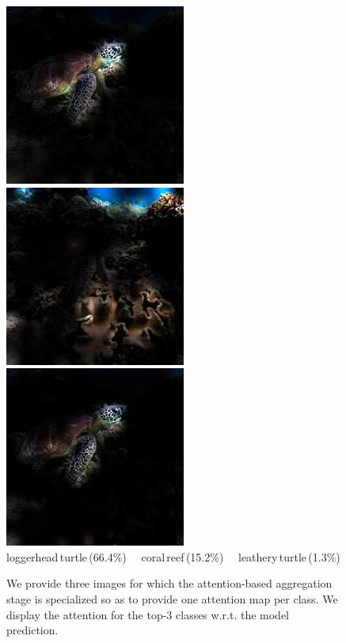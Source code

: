 \begin{figure}[t]
              \includegraphics[width=0.24\linewidth]{figs/multiclass/attn0_multi_pexels-keemkai-villadums-2435728.jpg} \hfill %
              \includegraphics[width=0.24\linewidth]{figs/multiclass/attn1_multi_pexels-keemkai-villadums-2435728.jpg} \hfill %
              \includegraphics[width=0.24\linewidth]{figs/multiclass/attn2_multi_pexels-keemkai-villadums-2435728.jpg}  \\[-5pt] %
             {\scriptsize \phantom{0} \hspace{0.18\linewidth} loggerhead\,turtle\,(66.4\%) ~~coral\,reef\,(15.2\%) ~~leathery\,turtle\,(1.3\%)}%
              \\
          
        \vspace{-3ex}
    \caption{
    We provide three images for which the attention-based aggregation stage is specialized so as to provide one attention map per class.  We display the attention for the top-3 classes w.r.t. the model prediction. 
    \label{fig:visu_attention}}
\end{figure}
